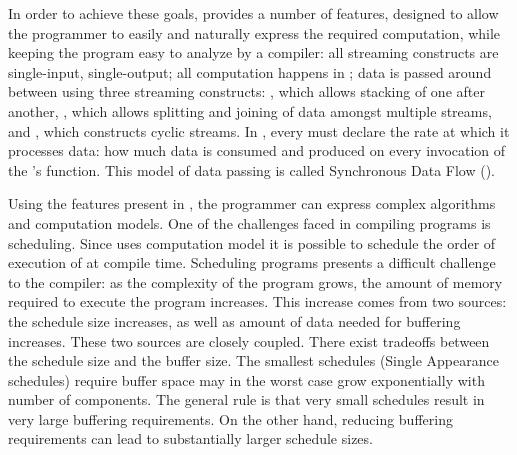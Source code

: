 In order to achieve these goals, {\StreamIt} provides a number of
features, designed to allow the programmer to easily and naturally
express the required computation, while keeping the program easy
to analyze by a compiler: all {\StreamIt} streaming constructs are
single-input, single-output; all computation happens in
{\filters}; data is passed around between {\filters} using three
streaming constructs: {\pipeline}, which allows stacking of
{\filters} one after another, {\splitjoin}, which allows splitting
and joining of data amongst multiple streams, and {{\feedbackloop}},
which constructs cyclic streams.  In {\StreamIt}, every {\filter}
must declare the rate at which it processes data: how much data is
consumed and produced on every invocation of the {\filter}'s
{\work} function.  This model of data passing is called
Synchronous Data Flow ({\SDF}).

\begin{comment}
In addition to {\SDF}, {\StreamIt} allows the programmer to pass
data between {\filters} in an asynchronous manner, similar to a
combination of message passing and function calls. Timing of such
data delivery is expressed in terms of amount of information
wavefronts - the programmer can specify a delay between message
delivery and destination {\filter}'s processing of data currently
being produced or consumed by the source {\filter}.  Such timing
mechanism introduces latency and buffering constraints on
execution of {\StreamIt} programs.
\end{comment}

Using the features present in {\StreamIt}, the programmer can
express complex algorithms and computation models.  One of the
challenges faced in compiling {\StreamIt} programs is scheduling.
Since {\StreamIt} uses {\SDF} computation model it is possible to
schedule the order of execution of {\filters} at compile time.
Scheduling {\SDF} programs presents a difficult challenge to the
compiler:  as the complexity of the program grows, the amount of
memory required to execute the program increases.  This increase
comes from two sources: the schedule size increases, as well as
amount of data needed for buffering increases.  These two sources
are closely coupled. There exist tradeoffs between the schedule
size and the buffer size. The smallest schedules (Single
Appearance schedules) require buffer space may in the worst case
grow exponentially with number of components. The general rule is
that very small schedules result in very large buffering
requirements. On the other hand, reducing buffering requirements
can lead to substantially larger schedule sizes.

